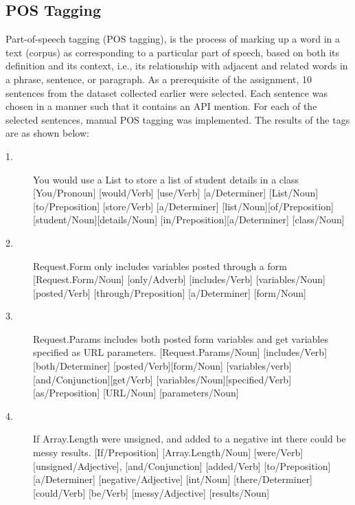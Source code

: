 \documentclass{sig-alternate-05-2015}
\begin{document}
\subsection{POS Tagging}

Part-of-speech tagging (POS tagging), is the process of marking up a word in a text (corpus) as corresponding to a particular part of speech, based on both its definition and its context, i.e., its relationship with adjacent and related words in a phrase, sentence, or paragraph. As a prerequisite of the assignment, 10 sentences from the dataset collected earlier were selected. Each sentence was chosen in a manner such that it contains an API mention. For each of the selected sentences, manual POS tagging was implemented. The results of the tags are as shown below: 

\begin{description}
\item[1.]
You would use a List to store a list of student details in a class \linebreak
{[You/Pronoun]} [would/Verb] [use/Verb] [a/Determiner] \linebreak
{[List/Noun]}{[to/Preposition]} [store/Verb] [a/Determiner] \linebreak
{[list/Noun]}{[of/Preposition]}[student/Noun][details/Noun] \linebreak
{[in/Preposition]}{[a/Determiner]} [class/Noun]

\item[2.]
Request.Form only includes variables posted through a form \linebreak
{[Request.Form/Noun]} [only/Adverb] [includes/Verb] \linebreak
{[variables/Noun]}[posted/Verb] [through/Preposition] \linebreak
{[a/Determiner]} [form/Noun]

\item[3.]
Request.Params includes both posted form variables and get variables specified as URL parameters. \linebreak
{[Request.Params/Noun]} [includes/Verb] \linebreak
{[both/Determiner]} {[posted/Verb]}[form/Noun] \linebreak
{[variables/verb]} [and/Conjunction]{[get/Verb]} \linebreak
{[variables/Noun]}[specified/Verb] [as/Preposition]\linebreak
{[URL/Noun]} [parameters/Noun]

\item[4.]
If Array.Length were unsigned, and added to a negative int there could be messy results. \linebreak
{[If/Preposition]} [Array.Length/Noun] [were/Verb] \linebreak
{[unsigned/Adjective]}, {[and/Conjunction]} [added/Verb] \linebreak
{[to/Preposition]} {[a/Determiner]} [negative/Adjective] \linebreak
{[int/Noun]} [there/Determiner] [could/Verb] [be/Verb] \linebreak
{[messy/Adjective]} [results/Noun]


\end{description}
\end{document}
